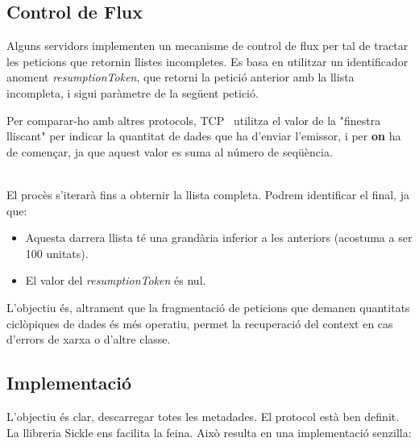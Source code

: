\clearpage

\subsection{Control de Flux}\label{subsec:flux-control}

Alguns servidors implementen un mecanisme de control de flux per tal de tractar les peticions que retornin llistes incompletes.
Es basa en utilitzar un identificador anoment \textit{resumptionToken}, que retorni la petició anterior amb la llista incompleta, i sigui paràmetre de la següent petició. \\

\begin{tcolorbox}[colback=blue!5!white, colframe=blue!75!black, title=Finestra lliscant]
    Per comparar-ho amb altres protocols, \gls{TCP}~\cite{tcp} utilitza el valor de la "finestra lliscant" per indicar la quantitat de dades que ha d'enviar l'emissor,
    i per \textbf{on} ha de començar, ja que aquest valor es suma al número de seqüència.
\end{tcolorbox}

\noindent \\
El procès s'iterarà fins a obternir la llista completa.
Podrem identificar el final, ja que:

\begin{itemize}
    \item Aquesta darrera llista té una grandària inferior a les anteriors (acostuma a ser 100 unitats).
    \item El valor del \textit{resumptionToken} és nul. \\
\end{itemize}

\noindent
L'objectiu és, altrament que la fragmentació de peticions que demanen quantitats ciclòpiques de dades és més operatiu,
permet la recuperació del context en cas d'errors de xarxa o d'altre classe.

\clearpage

\subsection{Implementació}\label{subsec:metadata-implemntation}

L'objectiu és clar, descarregar totes les metadades.
El protocol està ben definit.
La llibreria Sickle ens facilita la feina.
Això resulta en una implementació senzilla:

